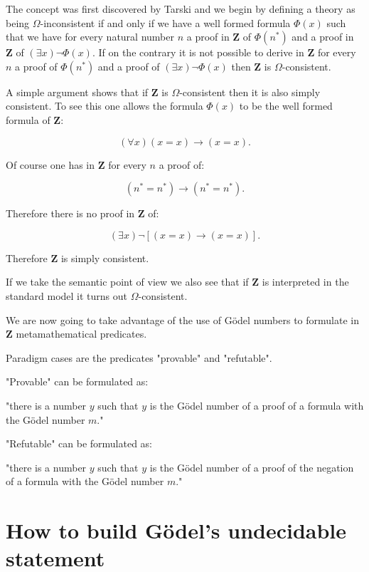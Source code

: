 \documentclass[12pt]{article}
\begin{document}
The concept was first discovered by Tarski and we begin by defining a theory as being $\Omega$-inconsistent if and only if we have a well formed formula $\Phi (x)$ such that we have for every natural number $n$ a proof in $\textbf{Z}$ of $\Phi (n^*)$ and a proof in $\textbf{Z}$ of $(\exists x) \neg \Phi (x)$. If on the contrary it is not possible to derive in $\textbf{Z}$ for every $n$ a proof of $\Phi (n^*)$ and a proof of $(\exists x) \neg \Phi (x)$ then $\textbf{Z}$ is $\Omega$-consistent.

A simple argument shows that if $\textbf{Z}$ is $\Omega$-consistent then it is also simply consistent. To see this one allows the formula $\Phi (x)$ to be the well formed formula of $\textbf{Z}$:

$$(\forall x) (x = x) \rightarrow (x = x).$$

Of course one has in $\textbf{Z}$ for every $n$ a proof of:
 
$$(n^* = n^*) \rightarrow (n^* = n^*).$$

Therefore there is no proof in $\textbf{Z}$ of:

$$(\exists x) \neg [ (x = x) \rightarrow (x = x)].$$

Therefore $\textbf{Z}$ is simply consistent.

If we take the semantic point of view we also see that if $\textbf{Z}$ is interpreted in the standard model it turns out $\Omega$-consistent.

We are now going to take advantage of the use of G\"{o}del numbers to formulate in $\textbf{Z}$ metamathematical predicates.

Paradigm cases are the predicates "provable" and "refutable".
 
"Provable" can be formulated as:
\begin{center}
"there is a number $y$ such that $y$ is the G\"{o}del number of a proof of a formula with the G\"{o}del number $m$."
\end{center}
 
"Refutable" can be formulated as:
\begin{center} 
"there is a number $y$ such that $y$ is the G\"{o}del number of a proof of the negation of a formula with the G\"{o}del number $m$."
\end{center}

\section{How to build G\"{o}del's undecidable statement}\normalsize
\end{document}
